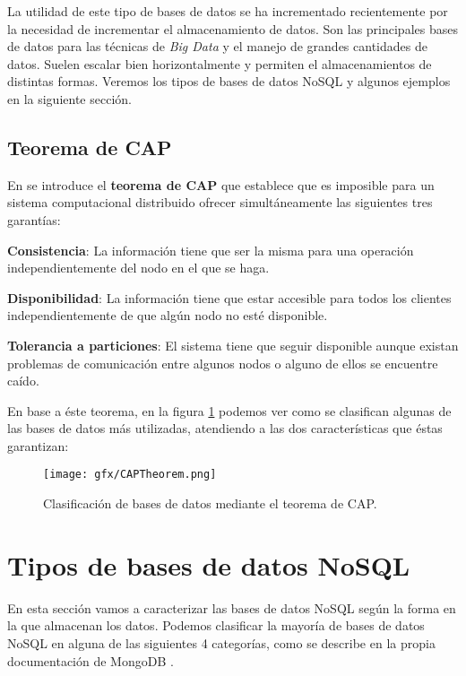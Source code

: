 La utilidad de este tipo de bases de datos se ha incrementado recientemente por la necesidad de incrementar el almacenamiento de datos. Son las principales bases de datos para las técnicas de \textit{Big Data} y el manejo de grandes cantidades de datos. Suelen escalar bien horizontalmente y permiten el almacenamientos de distintas formas. Veremos los tipos de bases de datos NoSQL y algunos ejemplos en la siguiente sección.

\subsection{Teorema de CAP}
En \cite{captheorem} se introduce el \textbf{teorema de CAP} que establece que es imposible para un sistema computacional distribuido ofrecer simultáneamente las siguientes tres garantías:

\textbf{Consistencia}: La información tiene que ser la misma para una operación independientemente del nodo en el que se haga.

\textbf{Disponibilidad}: La información tiene que estar accesible para todos los clientes independientemente de que algún nodo no esté disponible.

\textbf{Tolerancia a particiones}: El sistema tiene que seguir disponible aunque existan problemas de comunicación entre algunos nodos o alguno de ellos se encuentre caído.

En base a éste teorema, en la figura \ref{fig:captheorem} podemos ver como se clasifican algunas de las bases de datos más utilizadas, atendiendo a las dos características que éstas garantizan:

\begin{figure}[h]
  \centering
  \texttt{[image: gfx/CAPTheorem.png]}
  \caption{\label{fig:captheorem}Clasificación de bases de datos mediante el teorema de CAP.}
\end{figure}

\section{Tipos de bases de datos NoSQL}

En esta sección vamos a caracterizar las bases de datos NoSQL según la forma en la que almacenan los datos. Podemos clasificar la mayoría de bases de datos NoSQL en alguna de las siguientes 4 categorías, como se describe en la propia documentación de MongoDB \cite{mongoclassification}.

